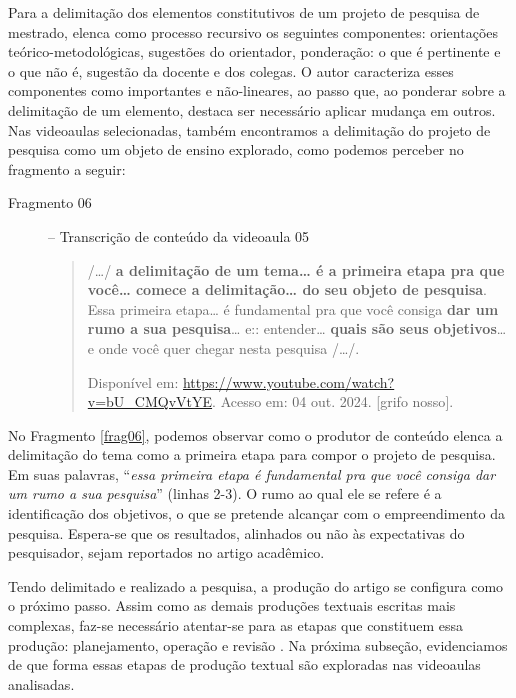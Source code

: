 Para a delimitação dos elementos constitutivos de um projeto de pesquisa
de mestrado, \textcite{silva2021} elenca como processo recursivo os seguintes
componentes: orientações teórico-metodológicas, sugestões do orientador,
ponderação: o que é pertinente e o que não é, sugestão da docente e dos
colegas. O autor caracteriza esses componentes como importantes e
não-lineares, ao passo que, ao ponderar sobre a delimitação de um
elemento, destaca ser necessário aplicar mudança em outros. Nas
videoaulas selecionadas, também encontramos a delimitação do projeto de
pesquisa como um objeto de ensino explorado, como podemos perceber no
fragmento a seguir:

\begin{description}
    \item[Fragmento 06\label{frag06}] -- Transcrição de conteúdo da videoaula 05

\begin{quote}
    /\ldots/ \textbf{a delimitação de um tema\ldots{} é a primeira etapa pra
que você\ldots{} comece a delimitação\ldots{} do seu objeto de
pesquisa}. Essa primeira etapa\ldots{} é fundamental pra que você
consiga \textbf{dar um rumo a sua pesquisa}\ldots{} e:: entender\ldots{}
\textbf{quais são seus objetivos}\ldots{} e onde você quer chegar nesta
pesquisa /\ldots/.

Disponível em:
\url{https://www.youtube.com/watch?v=bU_CMQvVtYE}.
Acesso em: 04 out. 2024. {[}grifo nosso{]}.
\end{quote}
\end{description}



No Fragmento \ref{frag06}, podemos observar como o produtor de conteúdo elenca a
delimitação do tema como a primeira etapa para compor o projeto de
pesquisa. Em suas palavras, ``\emph{essa primeira etapa é fundamental
pra que você consiga dar um rumo a sua pesquisa}'' (linhas 2-3). O rumo
ao qual ele se refere é a identificação dos objetivos, o que se pretende
alcançar com o empreendimento da pesquisa. Espera-se que os resultados,
alinhados ou não às expectativas do pesquisador, sejam reportados no
artigo acadêmico.

Tendo delimitado e realizado a pesquisa, a produção do artigo se
configura como o próximo passo. Assim como as demais produções textuais
escritas mais complexas, faz-se necessário atentar-se para as etapas que
constituem essa produção: planejamento, operação e revisão \cite{antunes2003}. Na próxima subseção, evidenciamos de que forma essas etapas de
produção textual são exploradas nas videoaulas analisadas.

